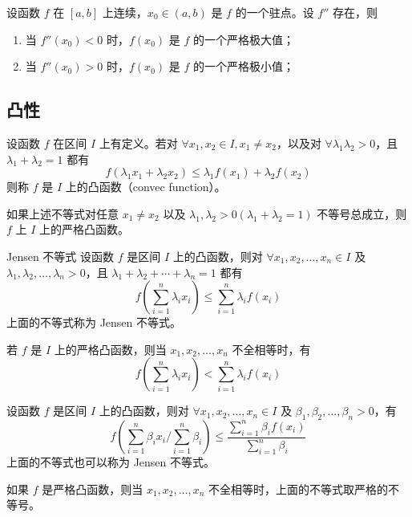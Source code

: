 \begin{theorem}
  设函数 $f$ 在 $[a,b]$ 上连续，$x_0 \in (a,b)$ 是 $f$ 的一个驻点。设 $f''$ 存在，则
  \begin{enumerate}
    \item 当 $f''(x_0) < 0$ 时，$f(x_0)$ 是 $f$ 的一个严格极大值；
    \item 当 $f''(x_0) > 0$ 时，$f(x_0)$ 是 $f$ 的一个严格极小值；
  \end{enumerate}
\end{theorem}

\subsection{凸性}

\begin{definition}
  设函数 $f$ 在区间 $I$ 上有定义。若对 $\forall x_1,x_2 \in I, x_1 \ne x_2$，以及对 $\forall \lambda_1 \lambda_2 > 0$，且 $\lambda_1 + \lambda_2 = 1$ 都有
  \[f(\lambda_{1}x_1 + \lambda_{2}x_2) \leqslant \lambda_{1}f(x_1) + \lambda_{2}f(x_2)\]
  则称 $f$ 是 $I$ 上的凸函数（convec function）。

  如果上述不等式对任意 $x_1 \ne x_2$ 以及 $\lambda_1,\lambda_2 > 0(\lambda_1 + \lambda_2 = 1)$ 不等号总成立，则 $f$ 上 $I$ 上的严格凸函数。
\end{definition}

\begin{theorem}{Jensen 不等式}
  设函数 $f$ 是区间 $I$ 上的凸函数，则对 $\forall x_1,x_2, \ldots ,x_n \in I$ 及 $\lambda_1,\lambda_2, \ldots ,\lambda_n > 0$，且 $\lambda_1 + \lambda_2 + \cdots + \lambda_n = 1$ 都有
  \[f(\sum_{i = 1}^{n}\lambda_{i}x_i) \leqslant \sum_{i = 1}^{n}\lambda_{i}f(x_i)\]
  上面的不等式称为 Jensen 不等式。

  若 $f$ 是 $I$ 上的严格凸函数，则当 $x_1,x_2, \ldots ,x_n$ 不全相等时，有
  \[f(\sum_{i = 1}^{n}\lambda_{i}x_i) < \sum_{i = 1}^{n}\lambda_{i}f(x_i)\]
\end{theorem}

\begin{theorem}
  设函数 $f$ 是区间 $I$ 上的凸函数，则对 $\forall x_1,x_2, \ldots ,x_n \in I$ 及 $\beta_1,\beta_2, \ldots ,\beta_n >0$，有
  \[f(\sum_{i = 1}^{n}\beta_{i}x_{i}/\sum_{i = 1}^{n}\beta_i) \leqslant \frac{\displaystyle \sum_{i = 1}^{n}\beta_{i}f(x_i)}{\displaystyle \sum_{i = 1}^{n}\beta_i}\]
  上面的不等式也可以称为 Jensen 不等式。

  如果 $f$ 是严格凸函数，则当 $x_1,x_2, \ldots ,x_n$ 不全相等时，上面的不等式取严格的不等号。
\end{theorem}

